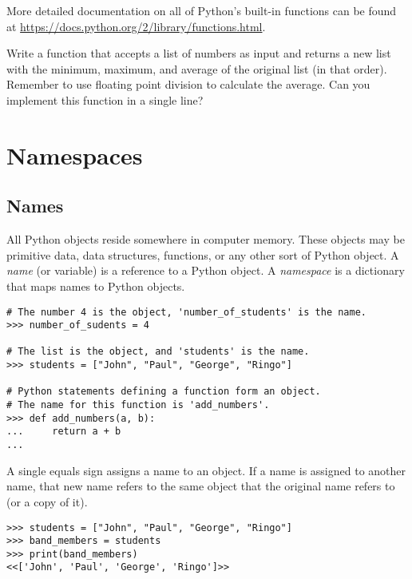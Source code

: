 More detailed documentation on all of Python's built-in functions can be found at \url{https://docs.python.org/2/library/functions.html}.

\begin{problem}
Write a function that accepts a list of numbers as input and returns a new list with the minimum, maximum, and average of the original list (in that order).
Remember to use floating point division to calculate the average.
Can you implement this function in a single line?
\end{problem}

\section*{Namespaces}

\subsection*{Names}
All Python objects reside somewhere in computer memory.
These objects may be primitive data, data structures, functions, or any other sort of Python object.
A \emph{name} (or variable) is a reference to a Python object.
A \emph{namespace} is a dictionary that maps names to Python objects.

\begin{lstlisting}
# The number 4 is the object, 'number_of_students' is the name.
>>> number_of_sudents = 4

# The list is the object, and 'students' is the name.
>>> students = ["John", "Paul", "George", "Ringo"]

# Python statements defining a function form an object.
# The name for this function is 'add_numbers'.
>>> def add_numbers(a, b):
...     return a + b
... 
\end{lstlisting}

A single equals sign assigns a name to an object.
If a name is assigned to another name, that new name refers to the same object that the original name refers to (or a copy of it).

\begin{lstlisting}
>>> students = ["John", "Paul", "George", "Ringo"]
>>> band_members = students
>>> print(band_members)
<<['John', 'Paul', 'George', 'Ringo']>>
\end{lstlisting}

